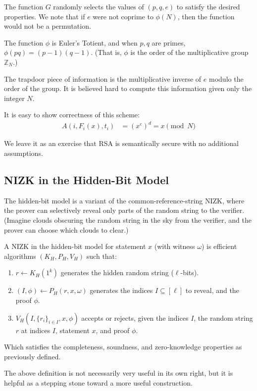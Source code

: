The function $G$ randomly selects the values of $(p, q, e)$ to satisfy the desired properties. We note that if  $e$ were not coprime to $\phi(N)$, then the function would
not be a permutation.

The function $\phi$ is Euler's Totient, and when $p,q$ are primes,
$\phi(pq) = (p-1)(q-1)$.
(That is, $\phi$ is the order of the multiplicative group $\mathbb{Z}_N$.)

The trapdoor piece of information is the multiplicative inverse of $e$ modulo the order of the
group. It is believed hard to compute this information given only the integer $N$.

It is easy to show correctness of this scheme:
\begin{align*}
A(i, F_i(x), t_i) &= (x^e)^d = x \pmod{N}
\end{align*}

We leave it as an exercise that RSA is semantically
secure with no additional assumptions.

\subsection{NIZK in the Hidden-Bit Model}
The hidden-bit model is a variant of the common-reference-string NIZK,
where the prover can selectively reveal only parts of the random string to the
verifier. (Imagine clouds obscuring the random string in the sky from the
verifier, and the prover can choose which clouds to clear.)

\newcommand{\setI}[1]{\{#1\}_{i \in I}}
\begin{definition}
    A NIZK in the hidden-bit model for statement $x$ (with witness $\omega$)
    is efficient algorithms $(K_H, P_H, V_H)$
    such that:
\begin{enumerate}
    \item $r \gets K_H(1^k)$ generates the hidden random string ($\ell$-bits).
    \item $(I, \phi) \gets P_H(r, x, \omega)$ generates the indices $I \subseteq
        [\ell]$ to reveal, and the proof $\phi$.
    \item $V_H(I, \setI{r_i}, x, \phi)$ accepts or rejects, given the indices $I$,
        the random string $r$ at indices $I$, statement $x$, and proof $\phi$.
\end{enumerate}
Which satisfies the completeness, soundness, and zero-knowledge properties as
previously defined.
\end{definition}
The above definition is not necessarily very useful in its own right, but it is helpful as a stepping stone toward a more useful construction.


